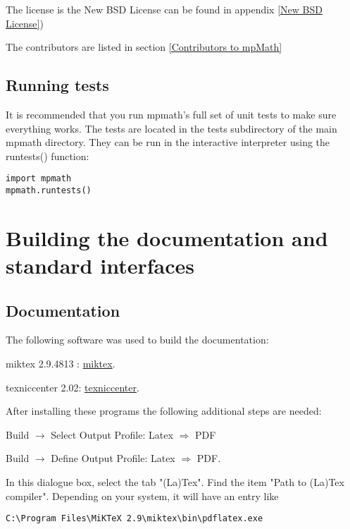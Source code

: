 \vpara
The license is the New BSD License  can be found in appendix \ref{New BSD License})

The contributors are listed in section \ref{Contributors to mpMath}



\subsection{Running tests}

It is recommended that you run mpmath's full set of unit tests to make sure everything works. The tests are located in the tests subdirectory of the main mpmath directory. They can be run in the interactive interpreter using the runtests() function:


\begin{lstlisting}
import mpmath
mpmath.runtests()
\end{lstlisting}




\newpage
\section{Building the documentation and standard interfaces}

\subsection{Documentation}

The following software was used to build the documentation:

miktex 2.9.4813 : \href{http://miktex.org/}{miktex}.

texniccenter 2.02: \href{http://www.texniccenter.org/}{texniccenter}.

After installing these programs the following additional steps are needed: 

\vpara

Build $\rightarrow$ Select Output Profile: Latex $\Rightarrow$ PDF

\vpara

Build $\rightarrow$ Define Output Profile: Latex $\Rightarrow$ PDF. 

In this dialogue box, select the tab "(La)Tex". Find the item "Path to (La)Tex compiler". 
Depending on your system, it will have an entry like

\begin{verbatim}
C:\Program Files\MiKTeX 2.9\miktex\bin\pdflatex.exe
\end{verbatim}

